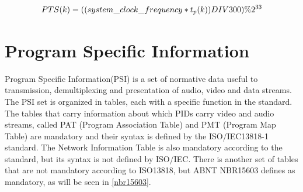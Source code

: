 \documentclass[
	12pt,				%
	openright,			%
	twoside,			%
	a4paper,			%
	brazil,
	french,				%
	english
	]{abntex2}
\begin{document}
\begin{equation}
PTS(k) = ((system\hspace{0.1mm}\_\hspace{0.1mm}clock\hspace{0.1mm}\_\hspace{0.1mm}frequency * t_p(k)) DIV 300) \% 2^{33}\\
\label{eq:pts}
\end{equation}





\section{Program Specific Information}
\label{iso_psi}

Program Specific Information(PSI) is a set of normative data useful to transmission, demultiplexing and presentation of audio, video and data streams. The PSI set is organized in tables, each with a specific function in the standard. The tables that carry information about which PIDs carry video and audio streams, called PAT (Program Association Table) and PMT (Program Map Table) are mandatory and their syntax is defined by the ISO/IEC13818-1 standard. The Network Information Table is also mandatory according to the standard, but its syntax is not defined by ISO/IEC. There is another set of tables that are not mandatory according to ISO13818, but ABNT NBR15603 defines as mandatory, as will be seen in \autoref{nbr15603}.
\end{document}

